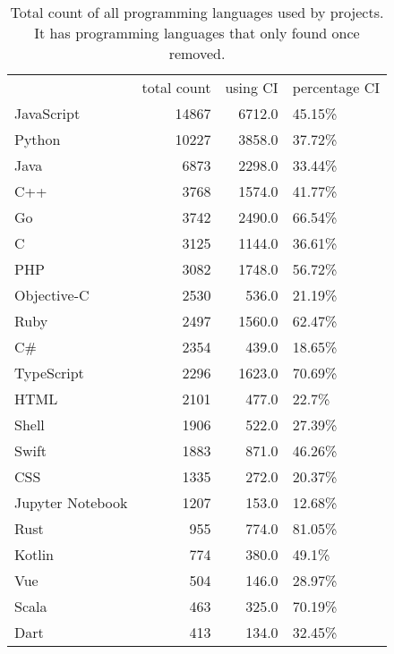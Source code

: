 \begin{table}
\centering
\caption{Total count of all programming languages used by projects. It has programming languages that only found once removed.}
\label{table:languages}
\begin{tabular}{lrrl}
\hline
{} &  total count &  using CI & percentage CI \\

JavaScript       &        14867 &    6712.0 &        45.15\% \\
Python           &        10227 &    3858.0 &        37.72\% \\
Java             &         6873 &    2298.0 &        33.44\% \\
C++              &         3768 &    1574.0 &        41.77\% \\
Go               &         3742 &    2490.0 &        66.54\% \\
C                &         3125 &    1144.0 &        36.61\% \\
PHP              &         3082 &    1748.0 &        56.72\% \\
Objective-C      &         2530 &     536.0 &        21.19\% \\
Ruby             &         2497 &    1560.0 &        62.47\% \\
C\#               &         2354 &     439.0 &        18.65\% \\
TypeScript       &         2296 &    1623.0 &        70.69\% \\
HTML             &         2101 &     477.0 &         22.7\% \\
Shell            &         1906 &     522.0 &        27.39\% \\
Swift            &         1883 &     871.0 &        46.26\% \\
CSS              &         1335 &     272.0 &        20.37\% \\
Jupyter Notebook &         1207 &     153.0 &        12.68\% \\
Rust             &          955 &     774.0 &        81.05\% \\
Kotlin           &          774 &     380.0 &         49.1\% \\
Vue              &          504 &     146.0 &        28.97\% \\
Scala            &          463 &     325.0 &        70.19\% \\
Dart             &          413 &     134.0 &        32.45\% \\

\end{tabular}
\end{table}
